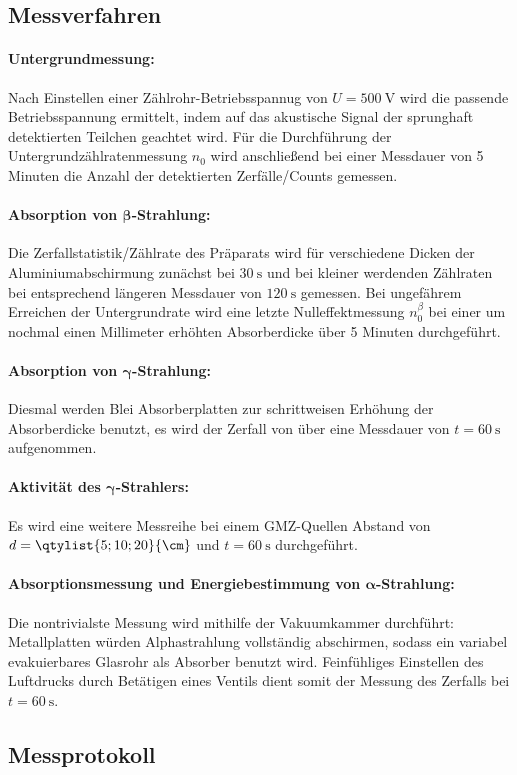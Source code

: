 \subsection{Messverfahren}
\paragraph{Untergrundmessung:} Nach Einstellen einer Zählrohr-Betriebsspannug von \(U=\qty{500}{\volt}\) wird die passende Betriebsspannung ermittelt, indem auf das akustische Signal der sprunghaft detektierten Teilchen geachtet wird. Für die Durchführung der Untergrundzählratenmessung \(n_0\) wird anschließend bei einer Messdauer von 5 Minuten die Anzahl der detektierten Zerfälle/Counts gemessen.

\paragraph{Absorption von \(\boldsymbol{\beta}\)-Strahlung:} Die Zerfallstatistik/Zählrate des  Präparats wird für verschiedene Dicken der Aluminiumabschirmung zunächst bei \(\qty{30}{\s}\) und bei kleiner werdenden Zählraten bei entsprechend längeren Messdauer von \(\qty{120}{\s}\) gemessen. Bei ungefährem Erreichen der Untergrundrate wird eine letzte Nulleffektmessung \(n_0^\beta\) bei einer um nochmal einen Millimeter erhöhten Absorberdicke über 5 Minuten durchgeführt. 

\paragraph{Absorption von \(\boldsymbol{\gamma}\)-Strahlung:} Diesmal werden Blei Absorberplatten zur schrittweisen Erhöhung der Absorberdicke benutzt, es wird der Zerfall von  über eine Messdauer von \(t=\qty{60}{\s}\) aufgenommen.

\paragraph{Aktivität des \(\boldsymbol{\gamma}\)-Strahlers:} Es wird eine weitere Messreihe bei einem GMZ-Quellen Abstand von \(d=\qtylist{5;10;20}{\cm}\) und \(t=\qty{60}{\s}\) durchgeführt.

\paragraph{Absorptionsmessung und Energiebestimmung von \(\boldsymbol{\alpha}\)-Strahlung:} Die nontrivialste Messung wird mithilfe der Vakuumkammer durchführt: Metallplatten würden Alphastrahlung vollständig abschirmen, sodass ein variabel evakuierbares Glasrohr als Absorber benutzt wird. Feinfühliges Einstellen des Luftdrucks durch Betätigen eines Ventils dient somit der Messung des Zerfalls bei \(t=\qty{60}{\s}\).

\vfill
\subsection{Messprotokoll}

